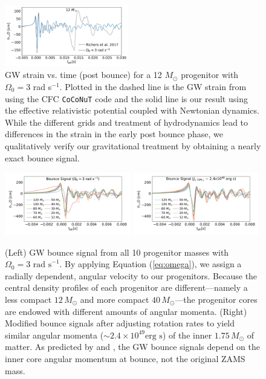 \documentclass[twocolumn,times]{aastex62}  %
\begin{document}
 \begin{figure}[t]
    \centering
    \includegraphics[width=0.48\textwidth]{bounce_richers.pdf}
    \caption{GW strain vs. time (post bounce) for a 12 \(M_\odot\) progenitor \citep{woosley:2007} with $\Omega_0 = 3$ rad s$^{-1}$.  Plotted in the dashed line is the GW strain from \citet{richers:2017} using the CFC \texttt{CoCoNuT} code and the solid line is our result using the effective relativistic potential coupled with Newtonian dynamics.  While the different grids and treatment of hydrodynamics lead to differences in the strain in the early post bounce phase, we qualitatively verify our gravitational treatment by obtaining a nearly exact bounce signal. }
    \label{fig:bounce_cfc}
\end{figure}

\begin{figure}[t]
  \centering     %
  \includegraphics[width=0.49\textwidth]{hd3_bounce_test.pdf}
  \includegraphics[width=0.49\textwidth]{hdj_bounce_final.pdf}
  \caption{(Left) GW bounce signal from all 10 progenitor masses with $\Omega_0 = 3 \text{ rad s}^{-1}$.  By applying Equation (\ref{eq:omega}), we assign a radially dependent, angular velocity to our progenitors.  Because the central density profiles of each progenitor are different---namely a less compact $12\,M_\odot$ and more compact $40\,M_\odot$---the progenitor cores are endowed with different amounts of angular momenta.   (Right) Modified bounce signals after adjusting rotation rates to yield similar angular momenta ($\sim 2.4\times10^{49} \text{erg s}$) of the inner $1.75\,M_\odot$ of matter.  As predicted by \citet{dimm:2008} and \citet{abdik:2010,abdik:2014}, the GW bounce signals depend on the inner core angular momentum at bounce, not the original ZAMS mass.}
  \label{fig:bounce}
\end{figure}
\end{document}

